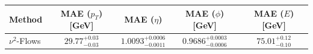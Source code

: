     \begin{tabular}{lcccc}
        \toprule
        Method & MAE ($p_T$) [GeV] & MAE ($\eta$) & MAE ($\phi$) [GeV] & MAE ($E$) [GeV] \\
        \midrule
        $\nu^2$-Flows & $29.77^{+0.03}_{-0.03}$ & $1.0093^{+0.0006}_{-0.0011}$ & $0.9686^{+0.0003}_{-0.0006}$ & $75.01^{+0.12}_{-0.10}$ \\
        \bottomrule
    \end{tabular}